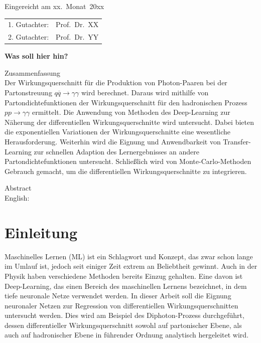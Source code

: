 \thispagestyle{empty}\vspace*{48em}

Eingereicht am xx.~Monat~20xx\vspace{1.5em}
\par{\large\begin{tabular}{ll}
 1. Gutachter: & Prof.~Dr.~XX \\
 2. Gutachter: & Prof.~Dr.~YY \\
\end{tabular}}


\newpage
\thispagestyle{empty}
\begin{center}\large\bfseries Was soll hier hin? \end{center}

Zusammenfassung \\
Der Wirkungsquerschnitt für die Produktion von Photon-Paaren bei der Partonstreuung $q\overline{q} \rightarrow \gamma \gamma$ wird berechnet. Daraus wird mithilfe von Partondichtefunktionen der Wirkungsquerschnitt für den hadronischen Prozess $pp \rightarrow \gamma \gamma$ ermittelt. Die Anwendung von Methoden des Deep-Learning zur Näherung der differentiellen Wirkungsquerschnitte wird untersucht. Dabei bieten die exponentiellen Variationen der Wirkungsquerschnitte eine wesentliche Herausforderung.
Weiterhin wird die Eignung und Anwendbarkeit von Transfer-Learning zur schnellen Adaption des Lernergebnisses an andere Partondichtefunktionen untersucht. Schließlich wird von Monte-Carlo-Methoden Gebrauch gemacht, um die differentiellen Wirkungsquerschnitte zu integrieren.


\vspace{20em}
Abstract \\ 
English: \\
 
 

\cleardoublepage
\tableofcontents
\cleardoublepage




\chapter{Einleitung}
Maschinelles Lernen (ML) ist ein Schlagwort und Konzept, das zwar schon lange im Umlauf ist, jedoch seit einiger Zeit extrem an Beliebtheit gewinnt. Auch in der Physik haben verschiedene Methoden bereits Einzug gehalten. Eine davon ist Deep-Learning, das einen Bereich des maschinellen Lernens bezeichnet, in dem tiefe neuronale Netze verwendet werden. In dieser Arbeit soll die Eignung neuronaler Netzen zur Regression von differentiellen Wirkungsquerschnitten untersucht werden. Dies wird am Beispiel des Diphoton-Prozess durchgeführt, dessen differentieller Wirkungsquerschnitt sowohl auf partonischer Ebene, als auch auf hadronischer Ebene in führender Ordnung analytisch hergeleitet wird.

